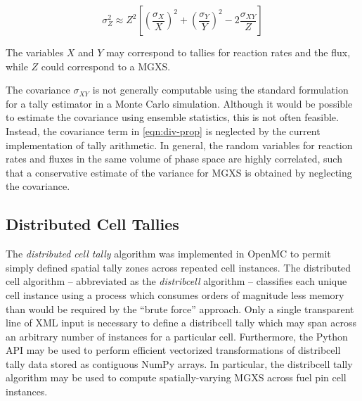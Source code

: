 \begin{equation}
\label{eqn:div-prop}
\sigma_{Z}^{2} \approx Z^{2}\left[\left(\frac{\sigma_{X}}{X}\right)^{2} + \left(\frac{\sigma_{Y}}{Y}\right)^{2} - 2\frac{\sigma_{XY}}{Z}\right]
\end{equation}

\noindent The variables $X$ and $Y$ may correspond to tallies for reaction rates and the flux, while $Z$ could correspond to a MGXS.

The covariance $\sigma_{XY}$ is not generally computable using the standard formulation for a tally estimator in a Monte Carlo simulation. Although it would be possible to estimate the covariance using ensemble statistics, this is not often feasible. Instead, the covariance term in \autoref{eqn:div-prop} is neglected by the current implementation of tally arithmetic. In general, the random variables for reaction rates and fluxes in the same volume of phase space are highly correlated, such that a conservative estimate of the variance for MGXS is obtained by neglecting the covariance.

\subsection{Distributed Cell Tallies}
\label{subsec:distribcells}


The \textit{distributed cell tally} algorithm was implemented in OpenMC \cite{lax2014distribcell} to permit simply defined spatial tally zones across repeated cell instances. The distributed cell algorithm -- abbreviated as the \textit{distribcell} algorithm -- classifies each unique cell instance using a process which consumes orders of magnitude less memory than would be required by the ``brute force'' approach. Only a single transparent line of XML input is necessary to define a distribcell tally which may span across an arbitrary number of instances for a particular cell. Furthermore, the Python API may be used to perform efficient vectorized transformations of distribcell tally data stored as contiguous NumPy arrays. In particular, the distribcell tally algorithm may be used to compute spatially-varying MGXS across fuel pin cell instances.

